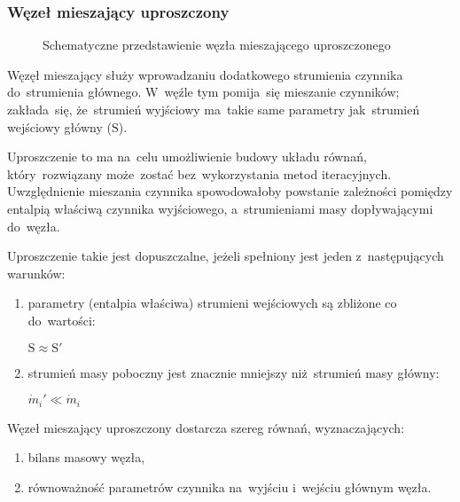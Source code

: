 \subsubsection{Węzeł mieszający uproszczony}

\begin{figure}[H]
	\centering


	\caption{Schematyczne przedstawienie węzła mieszającego
		uproszczonego}
\end{figure}

Węzęł mieszający służy wprowadzaniu dodatkowego strumienia czynnika
do~strumienia głównego. W~węźle tym pomija~się mieszanie czynników;
zakłada~się, że~strumień wyjściowy ma~takie same parametry jak~strumień
wejściowy główny ($\mathrm{S}$).

Uproszczenie to ma na~celu umożliwienie budowy układu równań,
który~rozwiązany może~zostać bez~wykorzystania metod iteracyjnych.
Uwzględnienie mieszania czynnika spowodowałoby powstanie zależności
pomiędzy entalpią właściwą czynnika wyjściowego, a~strumieniami masy
dopływającymi do~węzła.

Uproszczenie takie jest dopuszczalne, jeżeli spełniony jest jeden
z~następujących warunków:

\begin{enumerate}

	\item parametry (entalpia właściwa) strumieni wejściowych są
		zbliżone co do~wartości: \hfill

		\hspace*{\fill} $\mathrm{S} \approx \mathrm{S}'$ \hspace*{\fill}

	\item strumień masy poboczny jest znacznie mniejszy niż~strumień
		masy główny: \hfill

		\hspace*{\fill} $\dot m_i' \ll \dot m_i$ \hspace*{\fill}

\end{enumerate}

Węzeł mieszający uproszczony dostarcza szereg równań, wyznaczających:

\begin{enumerate}

	\item bilans masowy węzła,

	\item równoważność parametrów czynnika na~wyjściu i~wejściu głównym
		węzła.

\end{enumerate}
